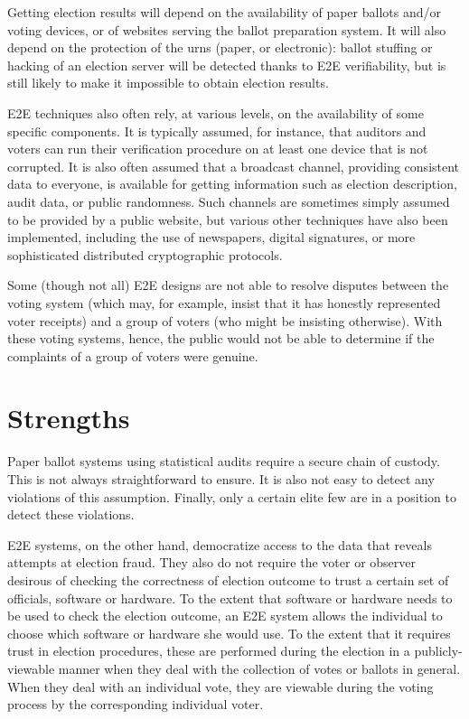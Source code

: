 Getting election results will depend on the availability of paper ballots
and/or voting devices, or of websites serving the ballot preparation system.
It will also depend on the protection of the urns (paper, or electronic):
ballot stuffing or hacking of an election server will be detected thanks to
E2E verifiability, but is still likely to make it impossible to obtain
election results.

E2E techniques also often rely, at various levels, on the availability of
some specific components. It is typically assumed, for instance, that
auditors and voters can run their verification procedure on at least one
device that is not corrupted. It is also often assumed that a broadcast
channel, providing consistent data to everyone, is available for getting
information such as election description, audit data, or public randomness.
Such channels are sometimes simply assumed to be provided by a public
website, but various other techniques have also been implemented, including
the use of newspapers, digital signatures, or more sophisticated distributed
cryptographic protocols.

Some (though not all) E2E designs are not able to resolve disputes between
the voting system (which may, for example, insist that it has honestly
represented voter receipts) and a group of voters (who might be insisting
otherwise). With these voting systems, hence, the public would not be able
to determine if the complaints of a group of voters were genuine.

\section{Strengths}

Paper ballot systems using statistical audits require a secure chain of
custody. This is not always straightforward to ensure. It is also not easy
to detect any violations of this assumption. Finally, only a certain elite
few are in a position to detect these violations.

E2E systems, on the other hand, democratize access to the data that reveals
attempts at election fraud. They also do not require the voter or observer
desirous of checking the correctness of election outcome to trust a certain
set of officials, software or hardware. To the extent that software or
hardware needs to be used to check the election outcome, an E2E system
allows the individual to choose which software or hardware she would use. To
the extent that it requires trust in election procedures, these are
performed during the election in a publicly-viewable manner when they deal
with the collection of votes or ballots in general. When they deal with an
individual vote, they are viewable during the voting process by the
corresponding individual voter.


